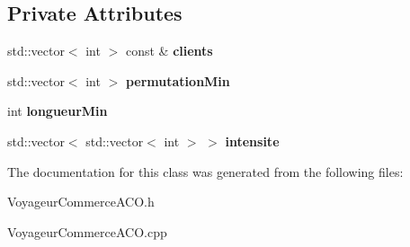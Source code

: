 \subsection*{\-Private \-Attributes}
\begin{DoxyCompactItemize}
\item 
\hypertarget{classVoyageurCommerceACO_a9758ddbb1e60eb3c0b87766941a08019}{std\-::vector$<$ int $>$ const \& {\bfseries clients}}\label{classVoyageurCommerceACO_a9758ddbb1e60eb3c0b87766941a08019}

\item 
\hypertarget{classVoyageurCommerceACO_a167179d4a335a0a64c7cad2bfc6c803e}{std\-::vector$<$ int $>$ {\bfseries permutation\-Min}}\label{classVoyageurCommerceACO_a167179d4a335a0a64c7cad2bfc6c803e}

\item 
\hypertarget{classVoyageurCommerceACO_a40fabb055842bd96f6aae08a1fc2e10f}{int {\bfseries longueur\-Min}}\label{classVoyageurCommerceACO_a40fabb055842bd96f6aae08a1fc2e10f}

\item 
\hypertarget{classVoyageurCommerceACO_aab8fde9e364ded0695964212632f82a0}{std\-::vector$<$ std\-::vector$<$ int $>$ $>$ {\bfseries intensite}}\label{classVoyageurCommerceACO_aab8fde9e364ded0695964212632f82a0}

\end{DoxyCompactItemize}


\-The documentation for this class was generated from the following files\-:\begin{DoxyCompactItemize}
\item 
\-Voyageur\-Commerce\-A\-C\-O.\-h\item 
\-Voyageur\-Commerce\-A\-C\-O.\-cpp\end{DoxyCompactItemize}
